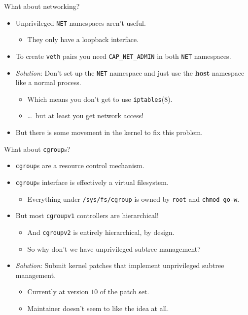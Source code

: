 \documentclass[10pt,aspectratio=169]{beamer}
\begin{document}
	\begin{frame}{What about networking?}
		\begin{itemize}
			\item Unprivileged \texttt{NET} namespaces aren't useful.
			\begin{itemize}
				\item They only have a loopback interface.
			\end{itemize}
			\item To create \texttt{veth} pairs you need \texttt{CAP\_NET\_ADMIN} in both \texttt{NET} namespaces.
			\item \textit{Solution}: Don't set up the \texttt{NET} namespace and just use the \textbf{host} namespace like a normal process.
			\begin{itemize}
				\item Which means you don't get to use \texttt{iptables}\@(8).
				\item \dots~but at least you get network access!
			\end{itemize}
			\item But there is some movement in the kernel to fix this problem.
		\end{itemize}
	\end{frame}

	\begin{frame}{What about \texttt{cgroup}s?}
		\begin{itemize}
			\item \texttt{cgroup}s are a resource control mechanism.
			\item \texttt{cgroup}s interface is effectively a virtual filesystem.
			\begin{itemize}
				\item Everything under \texttt{/sys/fs/cgroup} is owned by \texttt{root} and \texttt{chmod go-w}.
			\end{itemize}
			\item But most \texttt{cgroupv1} controllers are hierarchical!
			\begin{itemize}
				\item And \texttt{cgroupv2} is entirely hierarchical, by design.
				\item So why don't we have unprivileged subtree management?
			\end{itemize}
			\item \textit{Solution}: Submit kernel patches that implement unprivileged subtree management.
			\begin{itemize}
				\item Currently at version $10$ of the patch set.
				\item Maintainer doesn't seem to like the idea at all.
			\end{itemize}
		\end{itemize}
	\end{frame}
\end{document}

